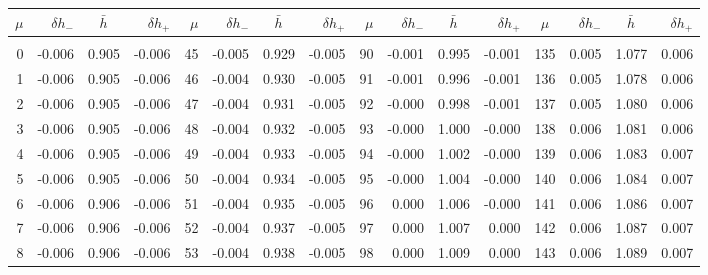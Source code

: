 \newpage
\begin{table}\centering
\small{ \begin{tabular}{rrrr|rrrr|rrrr|crrr}
$\mu$ & $\delta h_-$  & $\bar{h}~~~~$ & $\delta h_+$ &
$\mu$ & $\delta h_-$  & $\bar{h}~~~~$ & $\delta h_+$ &
$\mu$ & $\delta h_-$  & $\bar{h}~~~~$ & $\delta h_+$ &
$\mu$ & $\delta h_-$  & $\bar{h}~~~~$ & $\delta h_+$ \\\hline
&&&&&&&&&&&&&&&\\[-1.75ex]
  0 & \tiny{ -0.006} &   0.905 & \tiny{ -0.006} &  45 & \tiny{ -0.005} &   0.929 & \tiny{ -0.005} &  90 & \tiny{ -0.001} &   0.995 & \tiny{ -0.001} & 135 & \tiny{  0.005} &   1.077 & \tiny{  0.006}\\
  1 & \tiny{ -0.006} &   0.905 & \tiny{ -0.006} &  46 & \tiny{ -0.004} &   0.930 & \tiny{ -0.005} &  91 & \tiny{ -0.001} &   0.996 & \tiny{ -0.001} & 136 & \tiny{  0.005} &   1.078 & \tiny{  0.006}\\
  2 & \tiny{ -0.006} &   0.905 & \tiny{ -0.006} &  47 & \tiny{ -0.004} &   0.931 & \tiny{ -0.005} &  92 & \tiny{ -0.000} &   0.998 & \tiny{ -0.001} & 137 & \tiny{  0.005} &   1.080 & \tiny{  0.006}\\
  3 & \tiny{ -0.006} &   0.905 & \tiny{ -0.006} &  48 & \tiny{ -0.004} &   0.932 & \tiny{ -0.005} &  93 & \tiny{ -0.000} &   1.000 & \tiny{ -0.000} & 138 & \tiny{  0.006} &   1.081 & \tiny{  0.006}\\
  4 & \tiny{ -0.006} &   0.905 & \tiny{ -0.006} &  49 & \tiny{ -0.004} &   0.933 & \tiny{ -0.005} &  94 & \tiny{ -0.000} &   1.002 & \tiny{ -0.000} & 139 & \tiny{  0.006} &   1.083 & \tiny{  0.007}\\
  5 & \tiny{ -0.006} &   0.905 & \tiny{ -0.006} &  50 & \tiny{ -0.004} &   0.934 & \tiny{ -0.005} &  95 & \tiny{ -0.000} &   1.004 & \tiny{ -0.000} & 140 & \tiny{  0.006} &   1.084 & \tiny{  0.007}\\
  6 & \tiny{ -0.006} &   0.906 & \tiny{ -0.006} &  51 & \tiny{ -0.004} &   0.935 & \tiny{ -0.005} &  96 & \tiny{  0.000} &   1.006 & \tiny{ -0.000} & 141 & \tiny{  0.006} &   1.086 & \tiny{  0.007}\\
  7 & \tiny{ -0.006} &   0.906 & \tiny{ -0.006} &  52 & \tiny{ -0.004} &   0.937 & \tiny{ -0.005} &  97 & \tiny{  0.000} &   1.007 & \tiny{  0.000} & 142 & \tiny{  0.006} &   1.087 & \tiny{  0.007}\\
  8 & \tiny{ -0.006} &   0.906 & \tiny{ -0.006} &  53 & \tiny{ -0.004} &   0.938 & \tiny{ -0.005} &  98 & \tiny{  0.000} &   1.009 & \tiny{  0.000} & 143 & \tiny{  0.006} &   1.089 & \tiny{  0.007}\\

\end{tabular}}
\end{table}
